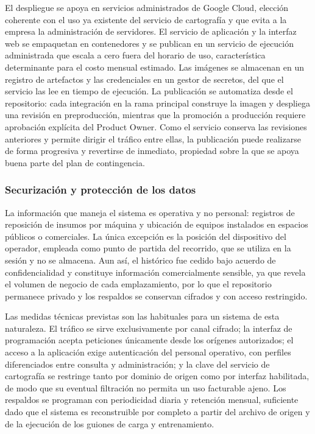 El despliegue se apoya en servicios administrados de Google Cloud, elección coherente con el uso ya existente del servicio de cartografía y que evita a la empresa la administración de servidores. El servicio de aplicación y la interfaz web se empaquetan en contenedores y se publican en un servicio de ejecución administrada que escala a cero fuera del horario de uso, característica determinante para el costo mensual estimado. Las imágenes se almacenan en un registro de artefactos y las credenciales en un gestor de secretos, del que el servicio las lee en tiempo de ejecución. La publicación se automatiza desde el repositorio: cada integración en la rama principal construye la imagen y despliega una revisión en preproducción, mientras que la promoción a producción requiere aprobación explícita del Product Owner. Como el servicio conserva las revisiones anteriores y permite dirigir el tráfico entre ellas, la publicación puede realizarse de forma progresiva y revertirse de inmediato, propiedad sobre la que se apoya buena parte del plan de contingencia.

\subsubsection{Securización y protección de los datos}\label{securizacion-y-proteccion-de-los-datos}

La información que maneja el sistema es operativa y no personal: registros de reposición de insumos por máquina y ubicación de equipos instalados en espacios públicos o comerciales. La única excepción es la posición del dispositivo del operador, empleada como punto de partida del recorrido, que se utiliza en la sesión y no se almacena. Aun así, el histórico fue cedido bajo acuerdo de confidencialidad y constituye información comercialmente sensible, ya que revela el volumen de negocio de cada emplazamiento, por lo que el repositorio permanece privado y los respaldos se conservan cifrados y con acceso restringido.

Las medidas técnicas previstas son las habituales para un sistema de esta naturaleza. El tráfico se sirve exclusivamente por canal cifrado; la interfaz de programación acepta peticiones únicamente desde los orígenes autorizados; el acceso a la aplicación exige autenticación del personal operativo, con perfiles diferenciados entre consulta y administración; y la clave del servicio de cartografía se restringe tanto por dominio de origen como por interfaz habilitada, de modo que su eventual filtración no permita un uso facturable ajeno. Los respaldos se programan con periodicidad diaria y retención mensual, suficiente dado que el sistema es reconstruible por completo a partir del archivo de origen y de la ejecución de los guiones de carga y entrenamiento.


